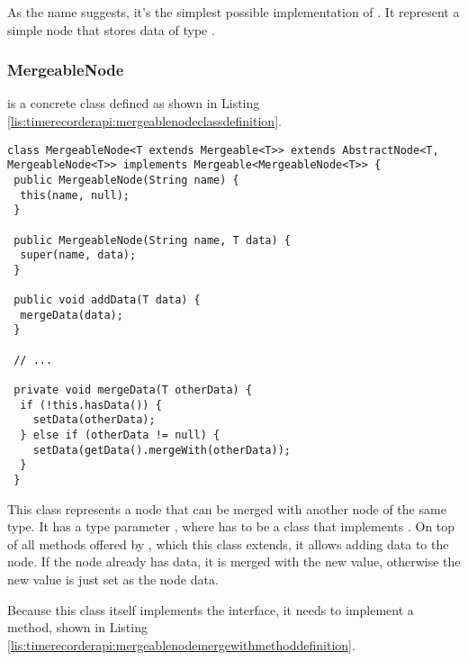 \noindent As the name suggests, it's the simplest possible implementation of . It represent a simple node that stores data of type .

\subsubsection{MergeableNode}

 is a concrete class defined as shown in Listing \ref{lis:timerecorderapi:mergeablenodeclassdefinition}.

\noindent\begin{minipage}[c]{\linewidth}
\begin{lstlisting}[breaklines,caption={MergeableNode class definition},label=lis:timerecorderapi:mergeablenodeclassdefinition]
class MergeableNode<T extends Mergeable<T>> extends AbstractNode<T, MergeableNode<T>> implements Mergeable<MergeableNode<T>> {
 public MergeableNode(String name) {
  this(name, null);
 }

 public MergeableNode(String name, T data) {
  super(name, data);
 }

 public void addData(T data) {
  mergeData(data);
 }
  
 // ...

 private void mergeData(T otherData) {
  if (!this.hasData()) {
    setData(otherData);
  } else if (otherData != null) {
    setData(getData().mergeWith(otherData));
  }
 }
\end{lstlisting}
\end{minipage}

\noindent This class represents a node that can be merged with another node of the same type. It has a type parameter , where  has to be a class that implements . On top of all methods offered by , which this class extends, it allows adding data to the node. If the node already has data, it is merged with the new value, otherwise the new value is just set as the node data.

\noindent Because this class itself implements the  interface, it needs to implement a  method, shown in Listing \ref{lis:timerecorderapi:mergeablenodemergewithmethoddefinition}.

